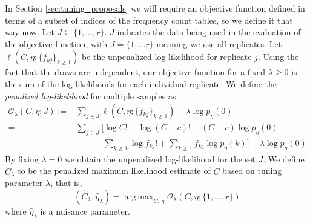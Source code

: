 \documentclass[12pt]{article}
\DeclareMathOperator*{\argmax}{arg\,max}
\begin{document}

In Section \ref{sec:tuning_proposals} we will require an objective function defined in terms of a subset of indices of the frequency count tables, so we define it that way now.  Let $J \subseteq \{1, \dots, r\}$.  $J$ indicates the data being used in the evaluation of the objective function, with $J = \{1, \dots r\}$ meaning we use all replicates.  Let $\ell \left(C, \eta; \{f_{kj}\}_{k \geq 1} \right)$ be the unpenalized log-likelihood for replicate $j$.
Using the fact that the draws are independent, our objective function for a fixed $\lambda \geq 0$ is the sum of the log-likelihoods for each individual replicate.
We define the \textit{penalized log-likelihood} for multiple samples as
\begin{align}
\mathcal{O}_{\lambda}(C, \eta; J) :=& \sum_{j \in J} \ell \left(C, \eta; \{f_{kj}\}_{k \geq 1} \right) - \lambda\log p_{\eta}(0) \\
 =& \sum_{j \in J} \biggl[ \log C! - \log (C-c)! + (C-c) \log p_\eta(0)  \nonumber \\
 & \qquad  - \sum_{k \geq 1} \log{} f_{kj}! + \sum_{k \geq 1} f_{kj} \log p_\eta(k) \biggr] - \lambda \log p_\eta(0)    \label{eq:objective}
\end{align}
By fixing $\lambda = 0$ we obtain the unpenalized log-likelihood for the set $J$.  We define $\widehat{C}_{\lambda}$ to be the penalized maximum likelihood estimate of $C$ based on tuning parameter $\lambda$, that is,
\begin{equation}
\left(\widehat{C}_{\lambda},  \widehat{\eta}_{\lambda} \right) = \argmax_{C, \, \eta}  \mathcal{O}_{\lambda} \left(C, \eta ; \{1, \dots , r\} \right) \label{eq:ccc_hat_lambda}
\end{equation}
where $\widehat{\eta}_{\lambda}$ is a nuisance parameter.
\end{document}
